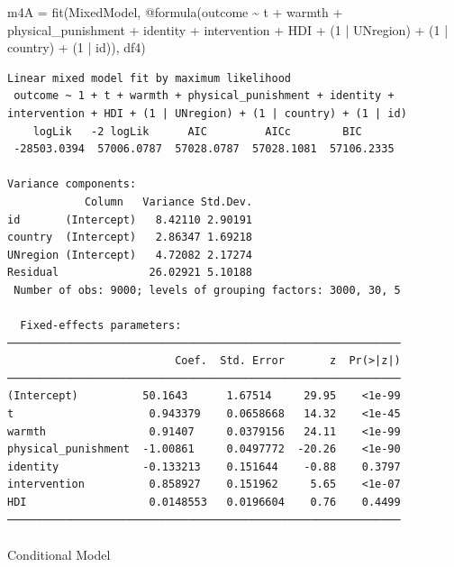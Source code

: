 \documentclass[
  letterpaper,
  DIV=11,
  numbers=noendperiod]{scrreprt}
\makeatletter
\let\oldparagraph\paragraph
\renewcommand{\paragraph}{
    \@ifstar
      \xxxParagraphStar
      \xxxParagraphNoStar
  }
\newcommand{\xxxParagraphStar}[1]{\oldparagraph*{#1}\mbox{}}
\newcommand{\xxxParagraphNoStar}[1]{\oldparagraph{#1}\mbox{}}
\newenvironment{Shaded}{\begin{snugshade}}{\end{snugshade}}
\newcommand{\FloatTok}[1]{\textcolor[rgb]{0.68,0.00,0.00}{#1}}
\newcommand{\FunctionTok}[1]{\textcolor[rgb]{0.28,0.35,0.67}{#1}}
\newcommand{\NormalTok}[1]{\textcolor[rgb]{0.00,0.23,0.31}{#1}}
\newcommand{\OperatorTok}[1]{\textcolor[rgb]{0.37,0.37,0.37}{#1}}
\newcommand{\PreprocessorTok}[1]{\textcolor[rgb]{0.68,0.00,0.00}{#1}}
\makeatother
\begin{document}
\begin{Shaded}
\begin{Highlighting}[]
\NormalTok{m4A }\OperatorTok{=} \FunctionTok{fit}\NormalTok{(MixedModel, }\PreprocessorTok{@formula}\NormalTok{(outcome }\OperatorTok{\textasciitilde{}}\NormalTok{ t }\OperatorTok{+}\NormalTok{ warmth }\OperatorTok{+} 
\NormalTok{                                  physical\_punishment }\OperatorTok{+} 
\NormalTok{                                  identity }\OperatorTok{+}\NormalTok{ intervention }\OperatorTok{+} 
\NormalTok{                                  HDI }\OperatorTok{+}
\NormalTok{                                  (}\FloatTok{1} \OperatorTok{|}\NormalTok{ UNregion) }\OperatorTok{+} 
\NormalTok{                                  (}\FloatTok{1} \OperatorTok{|}\NormalTok{ country) }\OperatorTok{+} 
\NormalTok{                                  (}\FloatTok{1} \OperatorTok{|}\NormalTok{ id)), df4)}
\end{Highlighting}
\end{Shaded}

\begin{verbatim}
Linear mixed model fit by maximum likelihood
 outcome ~ 1 + t + warmth + physical_punishment + identity + intervention + HDI + (1 | UNregion) + (1 | country) + (1 | id)
    logLik   -2 logLik      AIC         AICc        BIC     
 -28503.0394  57006.0787  57028.0787  57028.1081  57106.2335

Variance components:
            Column   Variance Std.Dev.
id       (Intercept)   8.42110 2.90191
country  (Intercept)   2.86347 1.69218
UNregion (Intercept)   4.72082 2.17274
Residual              26.02921 5.10188
 Number of obs: 9000; levels of grouping factors: 3000, 30, 5

  Fixed-effects parameters:
─────────────────────────────────────────────────────────────
                          Coef.  Std. Error       z  Pr(>|z|)
─────────────────────────────────────────────────────────────
(Intercept)          50.1643      1.67514     29.95    <1e-99
t                     0.943379    0.0658668   14.32    <1e-45
warmth                0.91407     0.0379156   24.11    <1e-99
physical_punishment  -1.00861     0.0497772  -20.26    <1e-90
identity             -0.133213    0.151644    -0.88    0.3797
intervention          0.858927    0.151962     5.65    <1e-07
HDI                   0.0148553   0.0196604    0.76    0.4499
─────────────────────────────────────────────────────────────
\end{verbatim}

\paragraph{Conditional Model}\label{conditional-model-2}
\end{document}
